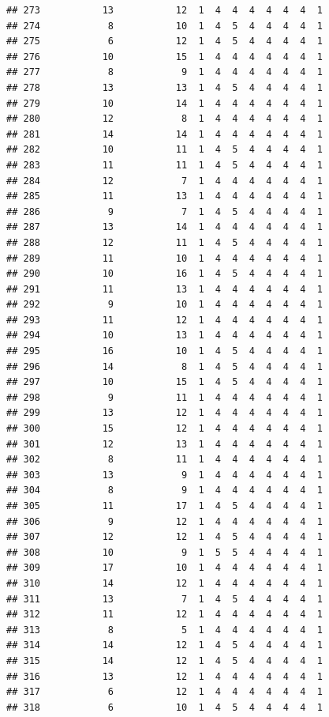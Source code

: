 \documentclass[12pt,]{krantz}
\theoremstyle{definition}
\theoremstyle{definition}
\theoremstyle{remark}
\begin{document}
\begin{verbatim}
## 273           13           12  1  4  4  4  4  4  4  1
## 274            8           10  1  4  5  4  4  4  4  1
## 275            6           12  1  4  5  4  4  4  4  1
## 276           10           15  1  4  4  4  4  4  4  1
## 277            8            9  1  4  4  4  4  4  4  1
## 278           13           13  1  4  5  4  4  4  4  1
## 279           10           14  1  4  4  4  4  4  4  1
## 280           12            8  1  4  4  4  4  4  4  1
## 281           14           14  1  4  4  4  4  4  4  1
## 282           10           11  1  4  5  4  4  4  4  1
## 283           11           11  1  4  5  4  4  4  4  1
## 284           12            7  1  4  4  4  4  4  4  1
## 285           11           13  1  4  4  4  4  4  4  1
## 286            9            7  1  4  5  4  4  4  4  1
## 287           13           14  1  4  4  4  4  4  4  1
## 288           12           11  1  4  5  4  4  4  4  1
## 289           11           10  1  4  4  4  4  4  4  1
## 290           10           16  1  4  5  4  4  4  4  1
## 291           11           13  1  4  4  4  4  4  4  1
## 292            9           10  1  4  4  4  4  4  4  1
## 293           11           12  1  4  4  4  4  4  4  1
## 294           10           13  1  4  4  4  4  4  4  1
## 295           16           10  1  4  5  4  4  4  4  1
## 296           14            8  1  4  5  4  4  4  4  1
## 297           10           15  1  4  5  4  4  4  4  1
## 298            9           11  1  4  4  4  4  4  4  1
## 299           13           12  1  4  4  4  4  4  4  1
## 300           15           12  1  4  4  4  4  4  4  1
## 301           12           13  1  4  4  4  4  4  4  1
## 302            8           11  1  4  4  4  4  4  4  1
## 303           13            9  1  4  4  4  4  4  4  1
## 304            8            9  1  4  4  4  4  4  4  1
## 305           11           17  1  4  5  4  4  4  4  1
## 306            9           12  1  4  4  4  4  4  4  1
## 307           12           12  1  4  5  4  4  4  4  1
## 308           10            9  1  5  5  4  4  4  4  1
## 309           17           10  1  4  4  4  4  4  4  1
## 310           14           12  1  4  4  4  4  4  4  1
## 311           13            7  1  4  5  4  4  4  4  1
## 312           11           12  1  4  4  4  4  4  4  1
## 313            8            5  1  4  4  4  4  4  4  1
## 314           14           12  1  4  5  4  4  4  4  1
## 315           14           12  1  4  5  4  4  4  4  1
## 316           13           12  1  4  4  4  4  4  4  1
## 317            6           12  1  4  4  4  4  4  4  1
## 318            6           10  1  4  5  4  4  4  4  1

\end{verbatim}
\end{document}
